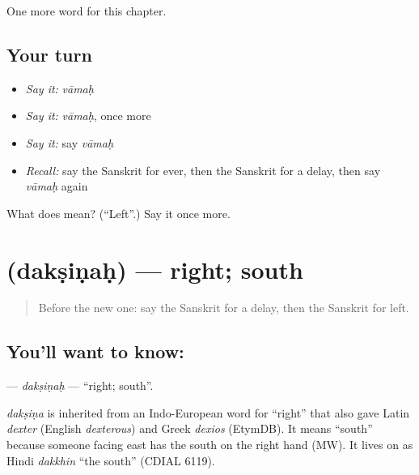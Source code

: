 \begin{grammarlens}[title={What you've built}]
One more word for this chapter.
\end{grammarlens}

\subsection*{Your turn}
\begin{itemize}
\raggedright
  \item \emph{Say it:} \emph{vāmaḥ}
  \item \emph{Say it:} \emph{vāmaḥ}, once more
  \item \emph{Say it:} say \emph{vāmaḥ}
  \item \emph{Recall:} say the Sanskrit for ever, then the Sanskrit for a delay, then say \emph{vāmaḥ} again
\end{itemize}

\begin{tcolorbox}[breakable,colback=teal!4,colframe=teal!35!black,title={Before you move on}]
What does  mean? (\textquotedblleft{}Left\textquotedblright{}.) Say it once more.
\end{tcolorbox}
\section[\texorpdfstring{\sk{दक्षिणः} (dakṣiṇaḥ)}{दक्षिणः (dakṣiṇaḥ)}]{ (dakṣiṇaḥ) — right; south}

\label{lesson:SA-C93-daksinah}



\begin{quote}
Before the new one: say the Sanskrit for a delay, then the Sanskrit for left.
\end{quote}

\subsection*{You'll want to know: }
\textbf{} — \emph{dakṣiṇaḥ} — \textquotedblleft{}right; south\textquotedblright{}.

\begin{cousinweb}
\emph{dakṣiṇa} is inherited from an Indo-European word for \textquotedblleft{}right\textquotedblright{} that also gave Latin \emph{dexter} (English \emph{dexterous}) and Greek \emph{dexios} (EtymDB). It means \textquotedblleft{}south\textquotedblright{} because someone facing east has the south on the right hand (MW). It lives on as Hindi \emph{dakkhin} \textquotedblleft{}the south\textquotedblright{} (CDIAL 6119).
\end{cousinweb}

